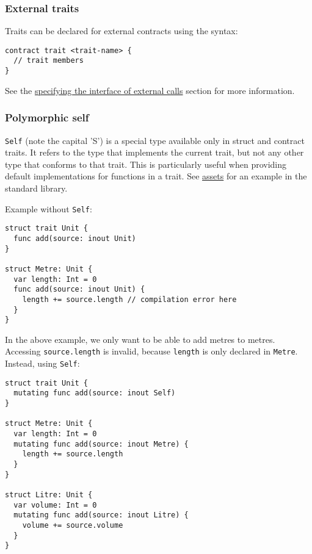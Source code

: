 \subsubsection{External traits}
\label{sec:appendix-b-external-traits}

Traits can be declared for external contracts using the syntax:

\begin{verbatim}
contract trait <trait-name> {
  // trait members
}
\end{verbatim}

See the \hyperref[sec:appendix-b-specifying-the-interface]{specifying the interface of external calls} section for more information.

\subsubsection{Polymorphic self}
\label{sec:appendix-b-polymorphic-self}

\texttt{Self} (note the capital 'S') is a special type available only in struct and contract traits. It refers to the type that implements the current trait, but not any other type that conforms to that trait. This is particularly useful when providing default implementations for functions in a trait. See \hyperref[sec:appendix-b-assets]{assets} for an example in the standard library.

Example without \texttt{Self}:

\begin{verbatim}
struct trait Unit {
  func add(source: inout Unit)
}

struct Metre: Unit {
  var length: Int = 0
  func add(source: inout Unit) {
    length += source.length // compilation error here
  }
}
\end{verbatim}

In the above example, we only want to be able to add metres to metres. Accessing \texttt{source.length} is invalid, because \texttt{length} is only declared in \texttt{Metre}. Instead, using \texttt{Self}:

\begin{verbatim}
struct trait Unit {
  mutating func add(source: inout Self)
}

struct Metre: Unit {
  var length: Int = 0
  mutating func add(source: inout Metre) {
    length += source.length
  }
}

struct Litre: Unit {
  var volume: Int = 0
  mutating func add(source: inout Litre) {
    volume += source.volume
  }
}
\end{verbatim}

